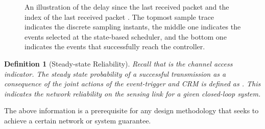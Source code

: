 \documentclass[journal]{IEEEtran}
\newtheorem{definition}{Definition}[section]
\begin{document}
\begin{figure}[tb]
 \caption{An illustration of the delay since the last received packet  and the index of the last received packet . The topmost sample trace indicates the discrete sampling instants, the middle one indicates the events selected at the state-based scheduler, and the bottom one indicates the events that successfully reach the controller. } \label{Fig:TimeLines}
\end{figure}

\begin{definition}[Steady-state Reliability]
Recall that  is the channel access indicator. The steady state probability of a successful transmission as a consequence of the joint actions of the event-trigger and CRM is defined as . This indicates the network reliability on the sensing link for a given closed-loop system.
\end{definition}

The above information is a prerequisite for any design methodology that seeks to achieve a certain network or system guarantee.
\end{document}

